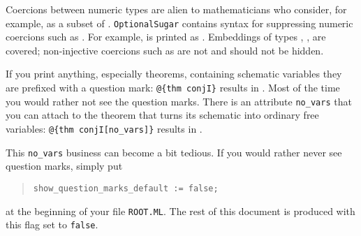 \begin{isabellebody}
\begin{isamarkuptext}
\begin{itemize}
\end{itemize}%
\end{isamarkuptext}%
\isamarkuptrue%
%
\isamarkuptrue%
%
\begin{isamarkuptext}%
Coercions between numeric types are alien to mathematicians who
consider, for example,  as a subset of .
\texttt{OptionalSugar} contains syntax for suppressing numeric coercions such
as   . For example,
 is printed as . Embeddings of types
, ,  are covered; non-injective coercions such
as    are not and should not be
hidden.%
\end{isamarkuptext}%
\isamarkuptrue%
%
\isamarkuptrue%
%
\isamarkuptrue%
%
\begin{isamarkuptext}%
If you print anything, especially theorems, containing
schematic variables they are prefixed with a question mark:
\verb!@!\verb!{thm conjI}! results in . Most of the time
you would rather not see the question marks. There is an attribute
\verb!no_vars! that you can attach to the theorem that turns its
schematic into ordinary free variables: \verb!@!\verb!{thm conjI[no_vars]}!
results in .

This \verb!no_vars! business can become a bit tedious.
If you would rather never see question marks, simply put
\begin{quote}
\verb|show_question_marks_default := false|\verb!;!
\end{quote}
at the beginning of your file \texttt{ROOT.ML}.
The rest of this document is produced with this flag set to \texttt{false}.


\end{isamarkuptext}
\end{isabellebody}
